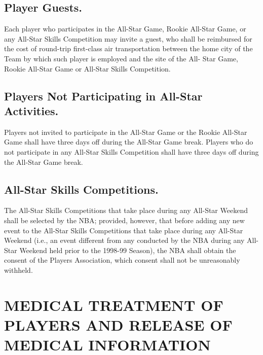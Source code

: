 \documentclass[
]{book}
\begin{document}
\hypertarget{player-guests.}{%
\section{Player Guests.}\label{player-guests.}}

Each player who participates in the All-Star Game, Rookie All-Star Game, or any All-Star Skills Competition may invite a guest, who shall be reimbursed for the cost of round-trip first-class air transportation between the home city of the Team by which such player is employed and the site of the All- Star Game, Rookie All-Star Game or All-Star Skills Competition.

\hypertarget{players-not-participating-in-all-star-activities.}{%
\section{Players Not Participating in All-Star Activities.}\label{players-not-participating-in-all-star-activities.}}

Players not invited to participate in the All-Star Game or the Rookie All-Star Game shall have three days off during the All-Star Game break. Players who do not participate in any All-Star Skills Competition shall have three days off during the All-Star Game break.

\hypertarget{all-star-skills-competitions.}{%
\section{All-Star Skills Competitions.}\label{all-star-skills-competitions.}}

The All-Star Skills Competitions that take place during any All-Star Weekend shall be selected by the NBA; provided, however, that before adding any new event to the All-Star Skills Competitions that take place during any All-Star Weekend (i.e., an event different from any conducted by the NBA during any All-Star Weekend held prior to the 1998-99 Season), the NBA shall obtain the consent of the Players Association, which consent shall not be unreasonably withheld.

\hypertarget{medical-treatment-of-players-and-release-of-medical-information}{%
\chapter{MEDICAL TREATMENT OF PLAYERS AND RELEASE OF MEDICAL INFORMATION}\label{medical-treatment-of-players-and-release-of-medical-information}}
\end{document}
